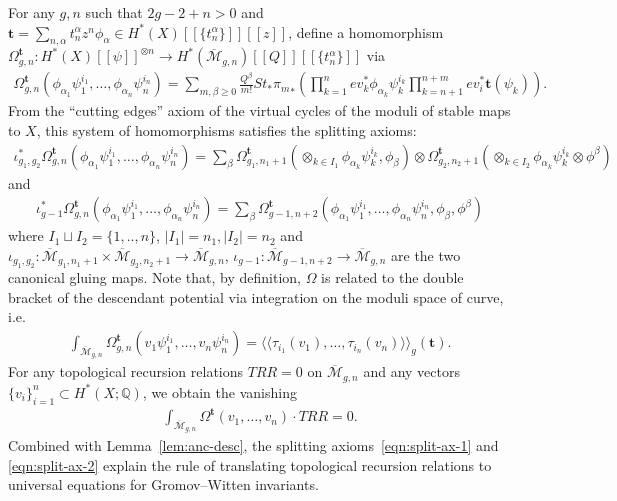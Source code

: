 \documentclass[12pt,reqno]{amsart}
\theoremstyle{plain}
\theoremstyle{definition}
\theoremstyle{remark}
\begin{document}
\begin{appendix}
For any $g, n$ such that $2g - 2 + n > 0$ and $\mathbf{t}=\sum_{n,\alpha}t_n^\alpha z^n\phi_\alpha\in H^*(X)[[\{t_n^\alpha\}]][[z]]$, define a homomorphism $\Omega^{\mathbf{t}}_{g,n}\colon H^*(X)[[\psi]]^{\otimes n}\rightarrow H^*(\overline{\mathcal{M}}_{g,n})[[Q]][[\{t_n^\alpha\}]]$ via
\begin{align*}
\Omega^{\mathbf{t}}_{g,n}(\phi_{\alpha_1}\psi_1^{i_1},\dots,\phi_{\alpha_n}\psi_n^{i_n})  
=\sum_{m,\beta\geq0}\frac{Q^\beta}{m!} St_*{\pi_m}_*\left(\prod_{k=1}^{n}ev_k^*\phi_{\alpha_k}\psi_k^{i_k}\prod_{k=n+1}^{n+m}ev_i^*\mathbf{t}(\psi_{k})\right).
\end{align*}
From the ``cutting edges'' axiom of the virtual cycles of the moduli of stable maps to $X$, this system of homomorphisms satisfies the splitting axioms:
\begin{align}\label{eqn:split-ax-1}
\iota_{g_1,g_2}^*\Omega_{g,n}^{\mathbf{t}}(\phi_{\alpha_1}\psi_1^{i_1},\dots,\phi_{\alpha_n}\psi_{n}^{i_n})
=\sum_{\beta}\Omega_{g_1,n_1+1}^{\mathbf{t}}(\otimes_{k\in I_1}\phi_{\alpha_k}\psi_k^{i_k},\phi_\beta)\otimes \Omega_{g_2,n_2+1}^{\mathbf{t}}(\otimes_{k\in I_2}\phi_{\alpha_k}\psi_k^{i_k}\otimes \phi^\beta)
\end{align}
and
\begin{align}\label{eqn:split-ax-2}
\iota_{g-1}^*\Omega_{g,n}^{\mathbf{t}}(\phi_{\alpha_1}\psi_1^{i_1},\dots,\phi_{\alpha_n}\psi_n^{i_n})
=\sum_{\beta}\Omega^{\mathbf{t}}_{g-1,n+2}(\phi_{\alpha_1}\psi_1^{i_1},\dots,\phi_{\alpha_n}\psi_n^{i_n},\phi_\beta,\phi^\beta)
\end{align}
where $I_1\sqcup I_2=\{1,..,n\}$, $|I_1|=n_1, |I_2|=n_2$ and $\iota_{g_1,g_2}\colon \overline{\mathcal{M}}_{g_1,n_1+1}\times \overline{\mathcal{M}}_{g_2,n_2+1}\rightarrow \overline{\mathcal{M}}_{g,n}$, $\iota_{g-1}\colon \overline{\mathcal{M}}_{g-1,n+2}\rightarrow \overline{\mathcal{M}}_{g,n}$ are the two canonical gluing maps.
Note that, by definition, $\Omega$ is related to the double bracket of the descendant potential via integration on the moduli space of curve, 
i.e.
\begin{align*}
\int_{\overline{\mathcal{M}}_{g,n}}\Omega_{g,n}^{\mathbf{t}}(v_1\psi_1^{i_1},\dots,v_n\psi_{n}^{i_n})
=\langle\langle\tau_{i_1}(v_1),\dots,\tau_{i_n}(v_n)\rangle\rangle_g(\mathbf{t}).
\end{align*} 
For any topological recursion relations $TRR=0$ on $\overline{\mathcal{M}}_{g,n}$ and any vectors $\{v_i\}_{i=1}^{n}\subset H^*(X;\mathbb{Q})$, we obtain the vanishing
\begin{align*}
\int_{\overline{\mathcal{M}}_{g,n}}\Omega^{\mathbf{t}}(v_1,\dots,v_n)\cdot TRR=0.    
\end{align*}
Combined with Lemma~\ref{lem:anc-desc},  the splitting axioms~\eqref{eqn:split-ax-1} and \eqref{eqn:split-ax-2} explain the rule of translating topological recursion relations to universal equations for Gromov--Witten invariants.

\end{appendix}
\end{document}
